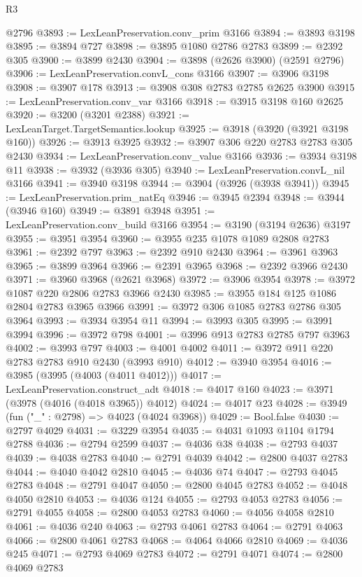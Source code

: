 \begin{lexlean}{R3}
\begin{coremodule}
    @2796
@3893 := LexLeanPreservation.conv_prim @3166
@3894 := @3893 @3198
@3895 := @3894 @727
@3898 := @3895 @1080 @2786 @2783
@3899 := @2392 @305
@3900 := @3899 @2430
@3904 := @3898 (@2626 @3900) (@2591 @2796)
@3906 := LexLeanPreservation.convL_cons @3166
@3907 := @3906 @3198
@3908 := @3907 @178
@3913 := @3908 @308 @2783 @2785 @2625 @3900
@3915 := LexLeanPreservation.conv_var @3166
@3918 := @3915 @3198 @160 @2625
@3920 := @3200 (@3201 @2388)
@3921 := LexLeanTarget.TargetSemantics.lookup
@3925 := @3918 (@3920 (@3921 @3198 @160))
@3926 := @3913 @3925
@3932 := @3907 @306 @220 @2783 @2783 @305 @2430
@3934 := LexLeanPreservation.conv_value @3166
@3936 := @3934 @3198 @11
@3938 := @3932 (@3936 @305)
@3940 := LexLeanPreservation.convL_nil @3166
@3941 := @3940 @3198
@3944 := @3904 (@3926 (@3938 @3941))
@3945 := LexLeanPreservation.prim_natEq
@3946 := @3945 @2394
@3948 := @3944 (@3946 @160)
@3949 := @3891 @3948
@3951 := LexLeanPreservation.conv_build @3166
@3954 := @3190 (@3194 @2636) @3197
@3955 := @3951 @3954
@3960 := @3955 @235 @1078 @1089 @2808 @2783
@3961 := @2392 @797
@3963 := @2392 @910 @2430
@3964 := @3961 @3963
@3965 := @3899 @3964
@3966 := @2391 @3965
@3968 := @2392 @3966 @2430
@3971 := @3960 @3968 (@2621 @3968)
@3972 := @3906 @3954
@3978 := @3972 @1087 @220 @2806 @2783 @3966 @2430
@3985 := @3955 @184 @125 @1086 @2804 @2783 @3965 @3966
@3991 := @3972 @306 @1085 @2783 @2786 @305 @3964
@3993 := @3934 @3954 @11
@3994 := @3993 @305
@3995 := @3991 @3994
@3996 := @3972 @798
@4001 := @3996 @913 @2783 @2785 @797 @3963
@4002 := @3993 @797
@4003 := @4001 @4002
@4011 := @3972 @911 @220 @2783 @2783 @910 @2430 (@3993 @910)
@4012 := @3940 @3954
@4016 := @3985 (@3995 (@4003 (@4011 @4012)))
@4017 := LexLeanPreservation.construct_adt
@4018 := @4017 @160
@4023 := @3971 (@3978 (@4016 (@4018 @3965)) @4012)
@4024 := @4017 @23
@4028 := @3949 (fun ("_" : @2798) => @4023 (@4024 @3968))
@4029 := Bool.false
@4030 := @2797 @4029
@4031 := @3229 @3954
@4035 := @4031 @1093 @1104 @1794 @2788
@4036 := @2794 @2599
@4037 := @4036 @38
@4038 := @2793 @4037
@4039 := @4038 @2783
@4040 := @2791 @4039
@4042 := @2800 @4037 @2783
@4044 := @4040 @4042 @2810
@4045 := @4036 @74
@4047 := @2793 @4045 @2783
@4048 := @2791 @4047
@4050 := @2800 @4045 @2783
@4052 := @4048 @4050 @2810
@4053 := @4036 @124
@4055 := @2793 @4053 @2783
@4056 := @2791 @4055
@4058 := @2800 @4053 @2783
@4060 := @4056 @4058 @2810
@4061 := @4036 @240
@4063 := @2793 @4061 @2783
@4064 := @2791 @4063
@4066 := @2800 @4061 @2783
@4068 := @4064 @4066 @2810
@4069 := @4036 @245
@4071 := @2793 @4069 @2783
@4072 := @2791 @4071
@4074 := @2800 @4069 @2783

\end{coremodule}
\end{lexlean}
